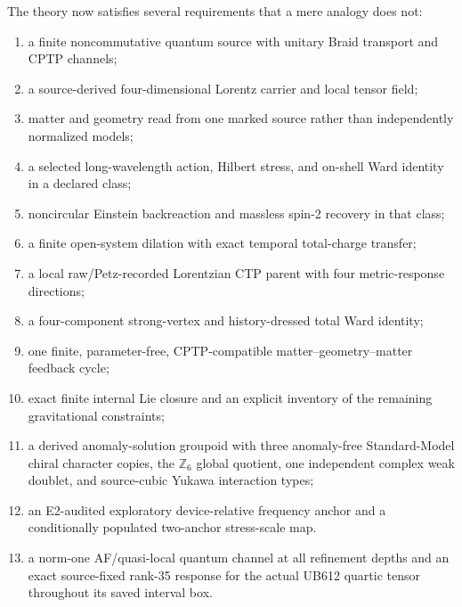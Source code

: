 \documentclass[11pt]{article}
\theoremstyle{definition}
\theoremstyle{remark}
\begin{document}
The theory now satisfies several requirements that a mere analogy does not:
\begin{enumerate}
\item a finite noncommutative quantum source with unitary Braid transport and CPTP channels;
\item a source-derived four-dimensional Lorentz carrier and local tensor field;
\item matter and geometry read from one marked source rather than independently normalized models;
\item a selected long-wavelength action, Hilbert stress, and on-shell Ward identity in a declared class;
\item noncircular Einstein backreaction and massless spin-2 recovery in that class;
\item a finite open-system dilation with exact temporal total-charge transfer;
\item a local raw/Petz-recorded Lorentzian CTP parent with four metric-response directions;
\item a four-component strong-vertex and history-dressed total Ward identity;
\item one finite, parameter-free, CPTP-compatible matter--geometry--matter feedback cycle;
\item exact finite internal Lie closure and an explicit inventory of the remaining gravitational constraints;
\item a derived anomaly-solution groupoid with three anomaly-free Standard-Model chiral character copies, the $\mathbb Z_6$ global quotient, one independent complex weak doublet, and source-cubic Yukawa interaction types;
\item an E2-audited exploratory device-relative frequency anchor and a conditionally populated two-anchor stress-scale map.
\item a norm-one AF/quasi-local quantum channel at all refinement depths and an exact source-fixed rank-35 response for the actual UB612 quartic tensor throughout its saved interval box.
\end{enumerate}
\end{document}
